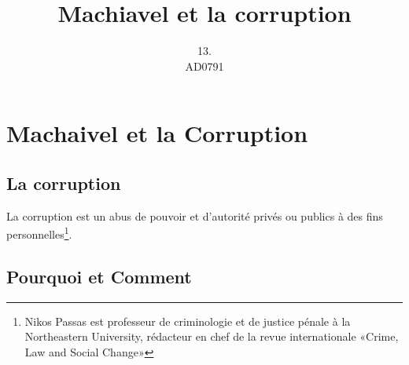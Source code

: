 \documentclass{book}           %
\title{Machiavel et la corruption}
\author{13.\\ AD0791}
\begin{document}

\maketitle                        %
\newpage
 \section{Machaivel et la Corruption}
\subsection{La corruption}
La corruption est un abus de pouvoir et d'autorit\'{e} priv\'{e}s ou publics \`{a} des fins personnelles\footnote{Nikos Passas est professeur de criminologie et de justice pénale à la Northeastern University, rédacteur en chef de la revue internationale «Crime, Law and Social Change»}.
\subsection{Pourquoi et Comment}
\end{document}
